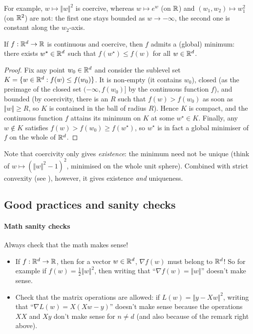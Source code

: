 For example, $w \mapsto \Vert w \Vert^2$ is coercive, whereas $w \mapsto e^w$ (on $\mathbb{R}$) and $(w_1, w_2) \mapsto w_1^2$ (on $\mathbb{R}^2$) are not: the first one stays bounded as $w \to -\infty$, the second one is constant along the $w_2$-axis.

\begin{prop}
\label{prop:coercive-min}
If $f : \mathbb{R}^d \to \mathbb{R}$ is continuous and coercive, then $f$ admits a (global) minimum: there exists $w^\star \in \mathbb{R}^d$ such that $f(w^\star) \leq f(w)$ for all $w \in \mathbb{R}^d$.
\end{prop}

\begin{proof}
Fix any point $w_0 \in \mathbb{R}^d$ and consider the sublevel set $K = \{ w \in \mathbb{R}^d : f(w) \leq f(w_0) \}$. It is non-empty (it contains $w_0$), closed (as the preimage of the closed set $(-\infty, f(w_0)]$ by the continuous function $f$), and bounded (by coercivity, there is an $R$ such that $f(w) > f(w_0)$ as soon as $\Vert w \Vert \geq R$, so $K$ is contained in the ball of radius $R$). Hence $K$ is compact, and the continuous function $f$ attains its minimum on $K$ at some $w^\star \in K$. Finally, any $w \notin K$ satisfies $f(w) > f(w_0) \geq f(w^\star)$, so $w^\star$ is in fact a global minimiser of $f$ on the whole of $\mathbb{R}^d$.
\end{proof}

Note that coercivity only gives \emph{existence}: the minimum need not be unique (think of $w \mapsto (\Vert w \Vert^2 - 1)^2$, minimised on the whole unit sphere). Combined with strict convexity (see ), however, it gives existence \emph{and} uniqueness.


\subsection{Good practices and sanity checks}
\label{subsec:sanity}

\paragraph{Math sanity checks} Always check that the math makes sense! 

\begin{itemize}
    \item  If $f : \mathbb{R}^d \to \mathbb{R}$, then for a vector $w \in \mathbb{R}^d$, $\nabla f(w)$ must belong to $\mathbb{R}^d$! So for example if $f(w) = \frac{1}{2} \Vert w \Vert^2$, then writing that ``$\nabla f(w) = \Vert w \Vert$'' doesn't make sense.
    \item Check that the matrix operations are allowed: if $L(w) = \Vert y - X w \Vert^2$, writing that ``$\nabla L(w) = X (X w -y)$'' doesn't make sense because the operations $X X$ and $X y$ don't make sense for $n \neq d$ (and also because of the remark right above).
\end{itemize}


